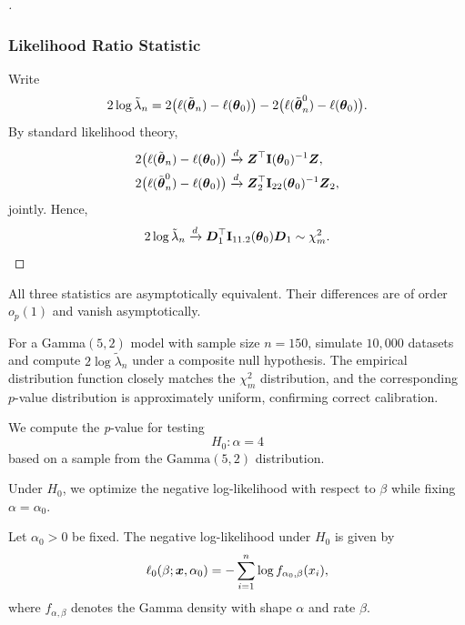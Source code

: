 \begin{proof}[]
\subsubsection*{Likelihood Ratio Statistic}

Write
\begin{equation*}
2\log\tilde{\lambda}_n
=
2\big(\ell(\tilde{\boldsymbol{\theta}}_n)-\ell(\boldsymbol{\theta}_0)\big)
-
2\big(\ell(\tilde{\boldsymbol{\theta}}_n^0)-\ell(\boldsymbol{\theta}_0)\big).
\end{equation*}
By standard likelihood theory,
\begin{align*}
2\big(\ell(\tilde{\boldsymbol{\theta}}_n)-\ell(\boldsymbol{\theta}_0)\big)
&\xrightarrow{d}
\boldsymbol{Z}^\top \mathbf{I}(\boldsymbol{\theta}_0)^{-1}\boldsymbol{Z},\\
2\big(\ell(\tilde{\boldsymbol{\theta}}_n^0)-\ell(\boldsymbol{\theta}_0)\big)
&\xrightarrow{d}
\boldsymbol{Z}_2^\top \mathbf{I}_{22}(\boldsymbol{\theta}_0)^{-1}\boldsymbol{Z}_2,
\end{align*}
jointly. Hence,
\begin{equation*}
2\log\tilde{\lambda}_n
\xrightarrow{d}
\boldsymbol{D}_1^\top \mathbf{I}_{11.2}(\boldsymbol{\theta}_0)\boldsymbol{D}_1
\sim
\chi^2_m .
\end{equation*}
\end{proof}

\begin{remark}
All three statistics are asymptotically equivalent. Their differences are of order $o_p(1)$
and vanish asymptotically.
\end{remark}

\begin{ex}
For a Gamma$(5,2)$ model with sample size $n=150$, simulate $10{,}000$ datasets and compute
$2\log\tilde{\lambda}_n$ under a composite null hypothesis. The empirical distribution function
closely matches the $\chi^2_m$ distribution, and the corresponding $p$-value distribution
is approximately uniform, confirming correct calibration.
\end{ex}



\begin{ex}
We compute the \emph{p}-value for testing
\[
H_0 : \alpha = 4
\]
based on a sample from the $\mathrm{Gamma}(5,2)$ distribution.

Under $H_0$, we optimize the negative log-likelihood with respect to $\beta$ while fixing
$\alpha=\alpha_0$.
\end{ex}

\begin{definition}
Let $\alpha_0>0$ be fixed. The negative log-likelihood under $H_0$ is given by
\begin{equation*}
\ell_0(\beta; \boldsymbol{x}, \alpha_0)
=
-\sum_{i=1}^n \log f_{\alpha_0,\beta}(x_i),
\end{equation*}
where $f_{\alpha,\beta}$ denotes the Gamma density with shape $\alpha$ and rate $\beta$.
\end{definition}

